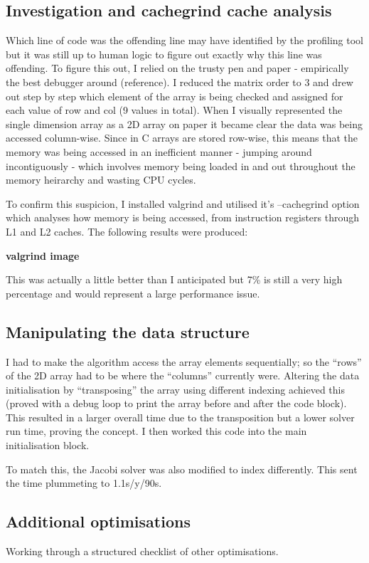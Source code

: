 \documentclass{article}
\begin{document}
\subsection{Investigation and cachegrind cache analysis}
Which line of code was the offending line may have identified by the profiling tool but it was still up to human logic to figure out exactly why this line was offending. To figure this out, I relied on the trusty pen and paper - empirically the best debugger around (reference). I reduced the matrix order to 3 and drew out step by step which element of the array is being checked and assigned for each value of row and col (9 values in total). When I visually represented the single dimension array as a 2D array on paper it became clear the data was being accessed column-wise. Since in C arrays are stored row-wise, this means that the memory was being accessed in an inefficient manner - jumping around incontiguously - which involves memory being loaded in and out throughout the memory heirarchy and wasting CPU cycles.

To confirm this suspicion, I installed valgrind and utilised it's --cachegrind option which analyses how memory is being accessed, from instruction registers through L1 and L2 caches. The following results were produced:

\textbf{valgrind image}

This was actually a little better than I anticipated but 7\% is still a very high percentage and would represent a large performance issue.

\subsection{Manipulating the data structure}
I had to make the algorithm access the array elements sequentially; so the ``rows'' of the 2D array had to be where the ``columns'' currently were. Altering the data initialisation by ``transposing'' the array using different indexing achieved this (proved with a debug loop to print the array before and after the code block). This resulted in a larger overall time due to the transposition but a lower solver run time, proving the concept. I then worked this code into the main initialisation block.

To match this, the Jacobi solver was also modified to index differently. This sent the time plummeting to 1.1s/y/90s.

\subsection{Additional optimisations}
Working through a structured checklist of other optimisations.
\end{document}
